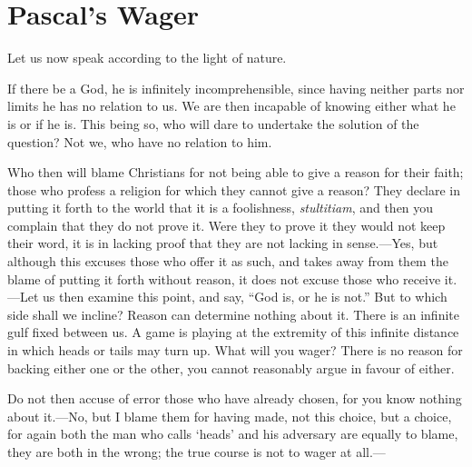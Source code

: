
\author{Blaise Pascal}
\chapter{Pascal's Wager}

Let us now speak according to the light of nature.

If there be a God, he is infinitely incomprehensible, since having
neither parts nor limits he has no relation to us. We are then
incapable of knowing either what he is or if he is. This being so, who
will dare to undertake the solution of the question? Not we, who have
no relation to him.

Who then will blame Christians for not being able to give a reason for
their faith; those who profess a religion for which they cannot give a
reason? They declare in putting it forth to the world that it is a
foolishness, \textit{stultitiam}, and then you complain that they do
not prove it. Were they to prove it they would not keep their word, it
is in lacking proof that they are not lacking in sense.---Yes, but
although this excuses those who offer it as such, and takes away from
them the blame of putting it forth without reason, it does not excuse
those who receive it.---Let us then examine this point, and say, ``God
is, or he is not.'' But to which side shall we incline? Reason can
 determine nothing about it. There is an infinite gulf fixed
between us. A game is playing at the extremity of this infinite
distance in which heads or tails may turn up. What will you wager?
There is no reason for backing either one or the other, you cannot
reasonably argue in favour of either.

Do not then accuse of error those who have already chosen, for you
know nothing about it.---No, but I blame them for having made, not
this choice, but a choice, for again both the man who calls `heads'
and his adversary are equally to blame, they are both in the wrong;
the true course is not to wager at all.---

